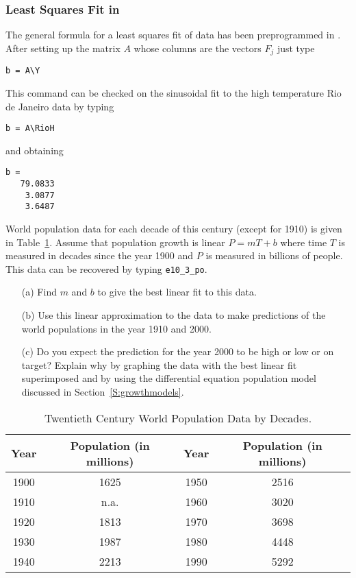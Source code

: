 \subsubsection*{Least Squares Fit in \Matlabp}

The general formula for a least squares fit of data  has been
preprogrammed in \Matlabp.  After setting up the matrix $A$ whose columns are 
the vectors $F_j$ just type
\begin{verbatim}
b = A\Y
\end{verbatim}
This \Matlab command can be checked on the sinusoidal fit to the high 
temperature Rio de Janeiro data by typing
\begin{verbatim}
b = A\RioH
\end{verbatim} 
and obtaining
\begin{verbatim}
b =
   79.0833
    3.0877
    3.6487
\end{verbatim}


\EXER

\CEXER

\begin{exercise} \label{c7.6.1}
World population data for each decade of this century (except for 1910)
is given in Table~\ref{T:popdata}.  Assume that population growth is linear
$P=mT+b$ where time $T$ is measured in decades since the year 1900 and $P$ is
measured in billions of people.  This data can be recovered by typing
{\tt e10\_3\_po}.
\begin{itemize}
\item[(a)]  Find $m$ and $b$ to give the best linear fit to this data.
\item[(b)]  Use this linear approximation to the data to make predictions
of the world populations in the year 1910 and 2000.
\item[(c)]  Do you expect the prediction for the year 2000 to be high or low
or on target? Explain why by graphing the data with the best linear fit
superimposed and by using the differential equation population model
discussed in Section~\ref{S:growthmodels}.
\end{itemize}
\begin{table}[htb]
\begin{center}
\begin{tabular}{|c|c||c|c|}
\hline
Year & Population (in millions) & Year & Population (in millions)\\
\hline
1900 & 1625 & 1950 & 2516  \\
1910 & n.a. & 1960 & 3020 \\
1920 & 1813 & 1970 & 3698 \\
1930 & 1987 & 1980 & 4448 \\
1940 & 2213 & 1990 & 5292 \\
\hline
\end{tabular}
\caption{Twentieth Century World Population Data by Decades.}
\label{T:popdata}
\end{center}
\end{table}

\end{exercise}

